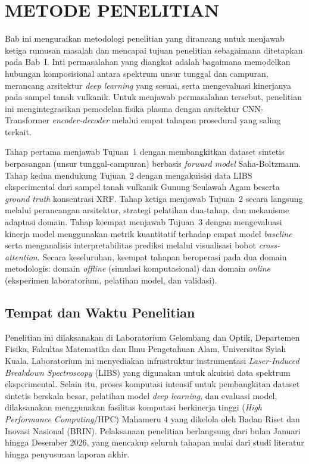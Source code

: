 
\chapter{METODE PENELITIAN}

Bab ini menguraikan metodologi penelitian yang dirancang untuk menjawab ketiga rumusan masalah dan mencapai tujuan penelitian sebagaimana ditetapkan pada Bab~I. Inti permasalahan yang diangkat adalah bagaimana memodelkan hubungan komposisional antara spektrum unsur tunggal dan campuran, merancang arsitektur \textit{deep learning} yang sesuai, serta mengevaluasi kinerjanya pada sampel tanah vulkanik. Untuk menjawab permasalahan tersebut, penelitian ini mengintegrasikan pemodelan fisika plasma dengan arsitektur CNN-Transformer \textit{encoder-decoder} melalui empat tahapan prosedural yang saling terkait.

Tahap pertama menjawab Tujuan~1 dengan membangkitkan dataset sintetis berpasangan (unsur tunggal-campuran) berbasis \textit{forward model} Saha-Boltzmann. Tahap kedua mendukung Tujuan~2 dengan mengakuisisi data LIBS eksperimental dari sampel tanah vulkanik Gunung Seulawah Agam beserta \textit{ground truth} konsentrasi XRF. Tahap ketiga menjawab Tujuan~2 secara langsung melalui perancangan arsitektur, strategi pelatihan dua-tahap, dan mekanisme adaptasi domain. Tahap keempat menjawab Tujuan~3 dengan mengevaluasi kinerja model menggunakan metrik kuantitatif terhadap empat model \textit{baseline} serta menganalisis interpretabilitas prediksi melalui visualisasi bobot \textit{cross-attention}. Secara keseluruhan, keempat tahapan beroperasi pada dua domain metodologis: domain \textit{offline} (simulasi komputasional) dan domain \textit{online} (eksperimen laboratorium, pelatihan model, dan validasi).

\section{Tempat dan Waktu Penelitian}
Penelitian ini dilaksanakan di Laboratorium Gelombang dan Optik, Departemen Fisika, Fakultas Matematika dan Ilmu Pengetahuan Alam, Universitas Syiah Kuala. Laboratorium ini menyediakan infrastruktur instrumentasi \textit{Laser-Induced Breakdown Spectroscopy} (LIBS) yang digunakan untuk akuisisi data spektrum eksperimental. Selain itu, proses komputasi intensif untuk pembangkitan dataset sintetis berskala besar, pelatihan model \textit{deep learning}, dan evaluasi model, dilaksanakan menggunakan fasilitas komputasi berkinerja tinggi (\textit{High Performance Computing}/HPC) Mahameru 4 yang dikelola oleh Badan Riset dan Inovasi Nasional (BRIN). Pelaksanaan penelitian berlangsung dari bulan Januari hingga Desember 2026, yang mencakup seluruh tahapan mulai dari studi literatur hingga penyusunan laporan akhir.

